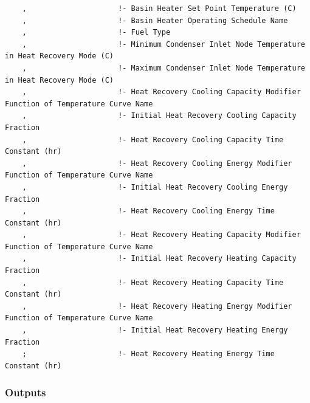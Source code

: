 \begin{lstlisting}
    ,                     !- Basin Heater Set Point Temperature (C)
    ,                     !- Basin Heater Operating Schedule Name
    ,                     !- Fuel Type
    ,                     !- Minimum Condenser Inlet Node Temperature in Heat Recovery Mode (C)
    ,                     !- Maximum Condenser Inlet Node Temperature in Heat Recovery Mode (C)
    ,                     !- Heat Recovery Cooling Capacity Modifier Function of Temperature Curve Name
    ,                     !- Initial Heat Recovery Cooling Capacity Fraction
    ,                     !- Heat Recovery Cooling Capacity Time Constant (hr)
    ,                     !- Heat Recovery Cooling Energy Modifier Function of Temperature Curve Name
    ,                     !- Initial Heat Recovery Cooling Energy Fraction
    ,                     !- Heat Recovery Cooling Energy Time Constant (hr)
    ,                     !- Heat Recovery Heating Capacity Modifier Function of Temperature Curve Name
    ,                     !- Initial Heat Recovery Heating Capacity Fraction
    ,                     !- Heat Recovery Heating Capacity Time Constant (hr)
    ,                     !- Heat Recovery Heating Energy Modifier Function of Temperature Curve Name
    ,                     !- Initial Heat Recovery Heating Energy Fraction
    ;                     !- Heat Recovery Heating Energy Time Constant (hr)
\end{lstlisting}

\subsubsection{Outputs}\label{outputs-039}


